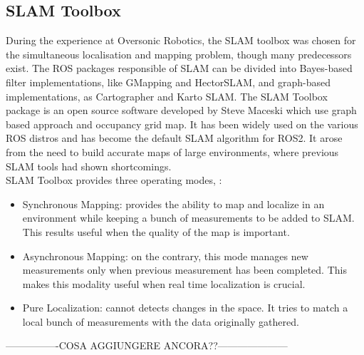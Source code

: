 \subsection{SLAM Toolbox}
During the experience at Oversonic Robotics, the SLAM toolbox was chosen for the simultaneous localisation and mapping problem, though many predecessors exist.
The ROS packages responsible of SLAM can be divided into Bayes-based filter implementations, like GMapping and HectorSLAM, and graph-based implementations, as Cartographer and Karto SLAM.
The SLAM Toolbox package is an open source software developed by Steve Maceski which use graph based approach and occupancy grid map.
It has been widely used on the various ROS distros and has become the default SLAM algorithm for ROS2. It arose from the need to build accurate maps of large environments, where previous SLAM tools had shown shortcomings.\\
SLAM Toolbox provides three operating modes, \citet{Macenski2021}:
\begin{itemize}
    \item Synchronous Mapping: provides the ability to map and localize in an environment while keeping a bunch of measurements to be added to SLAM. This results useful when the quality of the map is important.
    \item Asynchronous Mapping: on the contrary, this mode manages new measurements only when previous measurement has been completed. This makes this modality useful when real time localization is crucial.
    \item Pure Localization: cannot detects changes in the space. It tries to match a local bunch of measurements with the data originally gathered.
\end{itemize}
----------------COSA AGGIUNGERE ANCORA??---------------------


